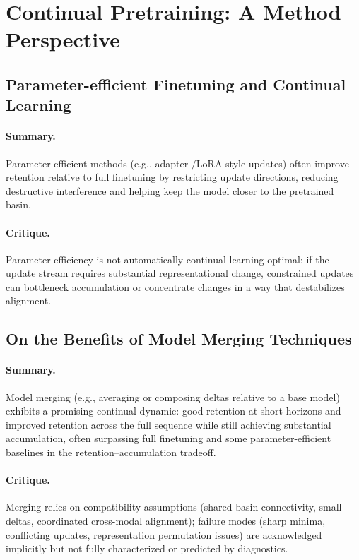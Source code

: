 \documentclass[12pt]{article}
\begin{document}
\section{Continual Pretraining: A Method Perspective}
\subsection{Parameter-efficient Finetuning and Continual Learning}
\paragraph{Summary.} Parameter-efficient methods (e.g., adapter-/LoRA-style updates) often improve retention
relative to full finetuning by restricting update directions, reducing destructive interference and helping
keep the model closer to the pretrained basin.
\paragraph{Critique.} Parameter efficiency is not automatically continual-learning optimal: if the update
stream requires substantial representational change, constrained updates can bottleneck accumulation or
concentrate changes in a way that destabilizes alignment.

\subsection{On the Benefits of Model Merging Techniques}
\paragraph{Summary.} Model merging (e.g., averaging or composing deltas relative to a base model) exhibits a
promising continual dynamic: good retention at short horizons and improved retention across the full sequence
while still achieving substantial accumulation, often surpassing full finetuning and some parameter-efficient
baselines in the retention--accumulation tradeoff.
\paragraph{Critique.} Merging relies on compatibility assumptions (shared basin connectivity, small deltas,
coordinated cross-modal alignment); failure modes (sharp minima, conflicting updates, representation
permutation issues) are acknowledged implicitly but not fully characterized or predicted by diagnostics.
\end{document}
